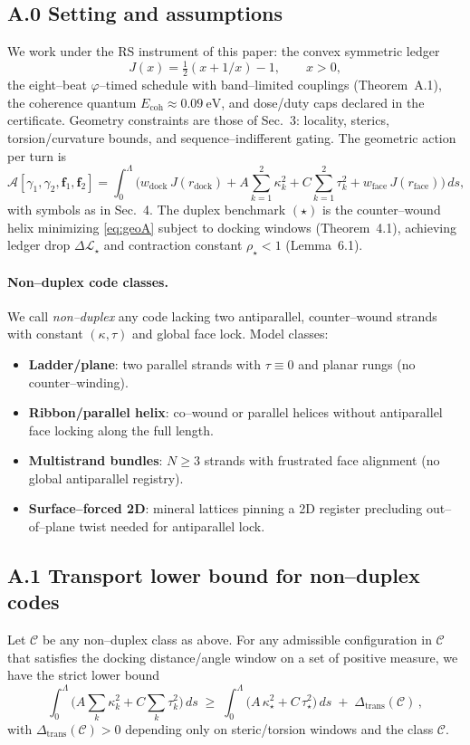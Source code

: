 \documentclass[11pt]{article}
\begin{document}
\subsection*{A.0 Setting and assumptions}
We work under the RS instrument of this paper: the convex symmetric ledger
\[
J(x)=\tfrac12(x+1/x)-1,\qquad x>0,
\]
the eight–beat $\varphi$–timed schedule with band–limited couplings (Theorem~A.1), the coherence quantum $E_{\mathrm{coh}}\approx 0.09~\mathrm{eV}$, and dose/duty caps declared in the certificate. Geometry constraints are those of Sec.~3: locality, sterics, torsion/curvature bounds, and sequence–indifferent gating. The geometric action per turn is
\begin{equation}\label{eq:geoA}
\mathcal{A}[\gamma_1,\gamma_2,\mathbf{f}_1,\mathbf{f}_2]
=
\int_0^\Lambda\!\Big(
w_{\mathrm{dock}}\,J(r_{\mathrm{dock}})
+A\sum_{k=1}^2\kappa_k^2
+C\sum_{k=1}^2\tau_k^2
+w_{\mathrm{face}}\,J(r_{\mathrm{face}})
\Big)\,ds,
\end{equation}
with symbols as in Sec.~4. The duplex benchmark $(\star)$ is the counter–wound helix minimizing \eqref{eq:geoA} subject to docking windows (Theorem~4.1), achieving ledger drop $\Delta\mathcal{L}_\star$ and contraction constant $\rho_\star<1$ (Lemma~6.1).

\paragraph{Non–duplex code classes.}
We call \emph{non–duplex} any code lacking two antiparallel, counter–wound strands with constant $(\kappa,\tau)$ and global face lock. Model classes:
\begin{itemize}
\item \textbf{Ladder/plane}: two parallel strands with $\tau\equiv 0$ and planar rungs (no counter–winding).
\item \textbf{Ribbon/parallel helix}: co–wound or parallel helices without antiparallel face locking along the full length.
\item \textbf{Multistrand bundles}: $N\ge 3$ strands with frustrated face alignment (no global antiparallel registry).
\item \textbf{Surface–forced 2D}: mineral lattices pinning a 2D register precluding out–of–plane twist needed for antiparallel lock.
\end{itemize}

\subsection*{A.1 Transport lower bound for non–duplex codes}
\begin{lemma}\label{lem:transport}
Let $\mathcal{C}$ be any non–duplex class as above. For any admissible configuration in $\mathcal{C}$ that satisfies the docking distance/angle window on a set of positive measure, we have the strict lower bound
\[
\int_0^\Lambda \!\Big(A\sum_k \kappa_k^2 + C\sum_k \tau_k^2\Big)\,ds
\;\ge\;
\int_0^\Lambda \!\Big(A\,\kappa_\star^2 + C\,\tau_\star^2\Big)\,ds
\;+\; \Delta_{\mathrm{trans}}(\mathcal{C})\,,
\]
with $\Delta_{\mathrm{trans}}(\mathcal{C})>0$ depending only on steric/torsion windows and the class $\mathcal{C}$.
\end{lemma}
\end{document}
